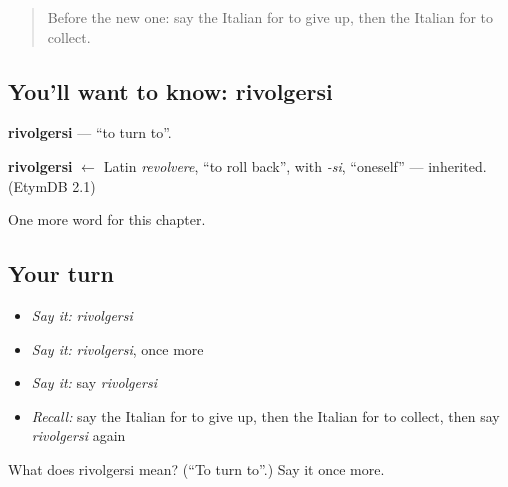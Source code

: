 \label{lesson:IT-C242-rivolgersi}



\begin{quote}
Before the new one: say the Italian for to give up, then the Italian for to collect.
\end{quote}

\subsection*{You'll want to know: rivolgersi}
\textbf{rivolgersi} — \textquotedblleft{}to turn to\textquotedblright{}.

\begin{cousinweb}
\textbf{rivolgersi} $\leftarrow$ Latin \emph{revolvere}, \textquotedblleft{}to roll back\textquotedblright{}, with \emph{-si}, \textquotedblleft{}oneself\textquotedblright{} — inherited. (EtymDB 2.1)
\end{cousinweb}

\begin{grammarlens}[title={What you've built}]
One more word for this chapter.
\end{grammarlens}

\subsection*{Your turn}
\begin{itemize}
\raggedright
  \item \emph{Say it:} \emph{rivolgersi}
  \item \emph{Say it:} \emph{rivolgersi}, once more
  \item \emph{Say it:} say \emph{rivolgersi}
  \item \emph{Recall:} say the Italian for to give up, then the Italian for to collect, then say \emph{rivolgersi} again
\end{itemize}

\begin{tcolorbox}[breakable,colback=teal!4,colframe=teal!35!black,title={Before you move on}]
What does rivolgersi mean? (\textquotedblleft{}To turn to\textquotedblright{}.) Say it once more.
\end{tcolorbox}
